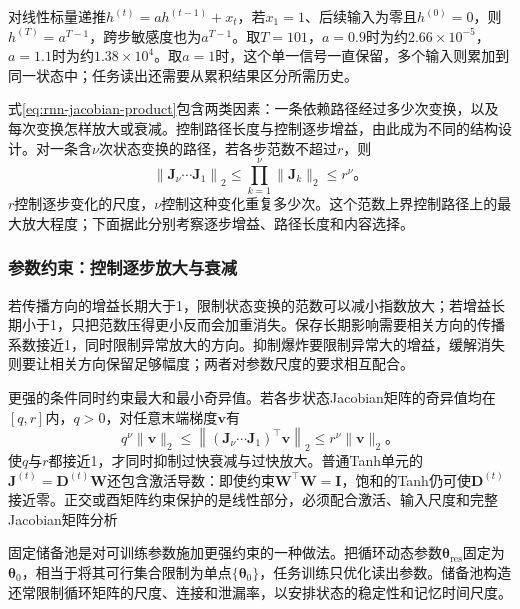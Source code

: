 \begin{example}[传播距离与状态保留]
  \label{ex:rnn-memory-decay}
  对线性标量递推$h^{(t)}=a h^{(t-1)}+x_t$，若$x_1=1$、后续输入为零且$h^{(0)}=0$，则$h^{(T)}=a^{T-1}$，跨步敏感度也为$a^{T-1}$。取$T=101$，$a=0.9$时为约$2.66\times10^{-5}$，$a=1.1$时为约$1.38\times10^4$。取$a=1$时，这个单一信号一直保留，多个输入则累加到同一状态中；任务读出还需要从累积结果区分所需历史。
\end{example}

式\eqref{eq:rnn-jacobian-product}包含两类因素：一条依赖路径经过多少次变换，以及每次变换怎样放大或衰减。控制路径长度与控制逐步增益，由此成为不同的结构设计。对一条含$\nu$次状态变换的路径，若各步范数不超过$r$，则
\begin{equation}
  \left\lVert\bm J_{\nu}\cdots\bm J_1\right\rVert_2
    \leq\prod_{k=1}^{\nu}\lVert\bm J_k\rVert_2\leq r^{\nu}\text{。}
  \label{eq:rnn-path-length-rate}
\end{equation}
$r$控制逐步变化的尺度，$\nu$控制这种变化重复多少次。这个范数上界控制路径上的最大放大程度；下面据此分别考察逐步增益、路径长度和内容选择。

\subsubsection{参数约束：控制逐步放大与衰减}
\label{sec:rnn-parameter-constraints}

若传播方向的增益长期大于1，限制状态变换的范数可以减小指数放大；若增益长期小于1，只把范数压得更小反而会加重消失。保存长期影响需要相关方向的传播系数接近1，同时限制异常放大的方向。抑制爆炸要限制异常大的增益，缓解消失则要让相关方向保留足够幅度；两者对参数尺度的要求相互配合。

更强的条件同时约束最大和最小奇异值。若各步状态Jacobian矩阵的奇异值均在$[q,r]$内，$q>0$，对任意末端梯度$\bm v$有
\begin{equation}
  q^{\nu}\lVert\bm v\rVert_2
    \leq\left\lVert(\bm J_{\nu}\cdots\bm J_1)^{\top}\bm v\right\rVert_2
    \leq r^{\nu}\lVert\bm v\rVert_2\text{。}
  \label{eq:rnn-path-singular-bounds}
\end{equation}
使$q$与$r$都接近1，才同时抑制过快衰减与过快放大。普通Tanh单元的$\bm J^{(t)}=\bm D^{(t)}\bm W$还包含激活导数：即使约束$\bm W^{\top}\bm W=\bm I$，饱和的Tanh仍可使$\bm D^{(t)}$接近零。正交或酉矩阵约束保护的是线性部分，必须配合激活、输入尺度和完整Jacobian矩阵分析

固定储备池是对可训练参数施加更强约束的一种做法。把循环动态参数$\bm\theta_{\mathrm{res}}$固定为$\bm\theta_0$，相当于将其可行集合限制为单点$\{\bm\theta_0\}$，任务训练只优化读出参数。储备池构造还常限制循环矩阵的尺度、连接和泄漏率，以安排状态的稳定性和记忆时间尺度。

